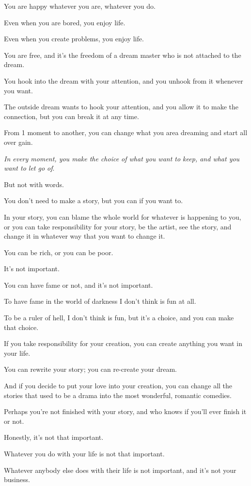\documentclass{article}
\numberwithin{equation}{section}
\begin{document}
You are happy whatever you are, whatever you do.

Even when you are bored, you enjoy life.

Even when you create problems, you enjoy life.

You are free, and it's the freedom of a dream master who is not attached to the dream.

You hook into the dream with your attention, and you unhook from it whenever you want.

The outside dream wants to hook your attention, and you allow it to make the connection, but you can break it at any time.

From 1 moment to another, you can change what you area dreaming and start all over gain.

%
\textit{In every moment, you make the choice of what you want to keep, and what you want to let go of}.

But not with words.

You don't need to make a story, but you can if you want to.

In your story, you can blame the whole world for whatever is happening to you, or you can take responsibility for your story, be the artist, see the story, and change it in whatever way that you want to change it.

You can be rich, or you can be poor.

It's not important.

You can have fame or not, and it's not important.

To have fame in the world of darkness I don't think is fun at all.

To be a ruler of hell, I don't think is fun, but it's a choice, and you can make that choice.

If you take responsibility for your creation, you can create anything you want in your life.

You can rewrite your story; you can re-create your dream.

And if you decide to put your love into your creation, you can change all the stories that used to be a drama into the most wonderful, romantic comedies.

%
Perhaps you're not finished with your story, and who knows if you'll ever finish it or not.

Honestly, it's not that important.

Whatever you do with your life is not that important.

Whatever anybody else does with their life is not important, and it's not your business.
\end{document}
